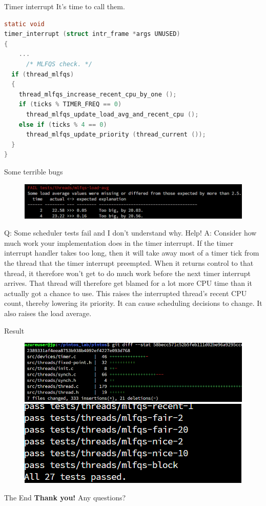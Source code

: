 \documentclass{beamer}
\begin{document}
\begin{frame}[fragile]{Timer interrupt}
It's time to call them.
\begin{lstlisting}[language=C]
static void
timer_interrupt (struct intr_frame *args UNUSED)
{
    ...
      /* MLFQS check. */
  if (thread_mlfqs)
  {
    thread_mlfqs_increase_recent_cpu_by_one ();
    if (ticks % TIMER_FREQ == 0)
      thread_mlfqs_update_load_avg_and_recent_cpu ();
    else if (ticks % 4 == 0)
      thread_mlfqs_update_priority (thread_current ());
  }
}
\end{lstlisting}
\end{frame}
\begin{frame}[fragile]{Some terrible bugs}
\small
    \begin{figure}
        \centering
        \includegraphics[width=0.8\linewidth]{pic/bugs.png}    
    \end{figure}
Q: Some scheduler tests fail and I don't understand why. Help!
A: Consider how much work your implementation does in the timer interrupt. If the timer interrupt handler takes too long, then it will take away most of a timer tick from the thread that the timer interrupt preempted. When it returns control to that thread, it therefore won't get to do much work before the next timer interrupt arrives. That thread will therefore get blamed for a lot more CPU time than it actually got a chance to use. This raises the interrupted thread's recent CPU count, thereby lowering its priority. It can cause scheduling decisions to change. It also raises the load average.
\end{frame}
\begin{frame}[fragile]{Result}
    \begin{figure}
        \centering
        \includegraphics[width=0.8\linewidth]{pic/result1.png}
        \includegraphics[width=0.8\linewidth]{pic/result2.png}
    \end{figure}
\end{frame}
\begin{frame}{The End}
    \centering
    \vfill
    \Huge
    \textbf{Thank you!}
    \vfill
    \normalsize
    Any questions?
    \vfill
\end{frame}
\end{document}
